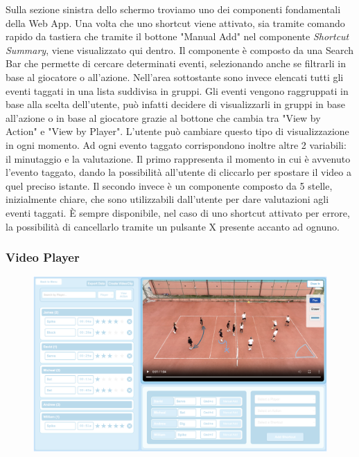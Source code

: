 Sulla sezione sinistra dello schermo troviamo uno dei componenti fondamentali della Web App. Una volta che uno shortcut viene attivato, sia tramite comando rapido da tastiera che tramite il bottone "Manual Add" nel componente \textit{Shortcut Summary}, viene visualizzato qui dentro. Il componente è composto da una Search Bar che permette di cercare determinati eventi, selezionando anche se filtrarli in base al giocatore o all'azione. Nell'area sottostante sono invece elencati tutti gli eventi taggati in una lista suddivisa in gruppi. Gli eventi vengono raggruppati in base alla scelta dell'utente, può infatti decidere di visualizzarli in gruppi in base all'azione o in base al giocatore grazie al bottone che cambia tra "View by Action" e "View by Player". L'utente può cambiare questo tipo di visualizzazione in ogni momento. Ad ogni evento taggato corrispondono inoltre altre 2 variabili: il minutaggio e la valutazione. Il primo rappresenta il momento in cui è avvenuto l'evento taggato, dando la possibilità all'utente di cliccarlo per spostare il video a quel preciso istante. Il secondo invece è un componente composto da 5 stelle, inizialmente chiare, che sono utilizzabili dall'utente per dare valutazioni agli eventi taggati. È sempre disponibile, nel caso di uno shortcut attivato per errore, la possibilità di cancellarlo tramite un pulsante X presente accanto ad ognuno.

\subsubsection{Video Player}
\begin{figure}
    \centering
    \includegraphics[width=\linewidth]{img/video_player.png}
    \label{fig:video_player}
\end{figure}

